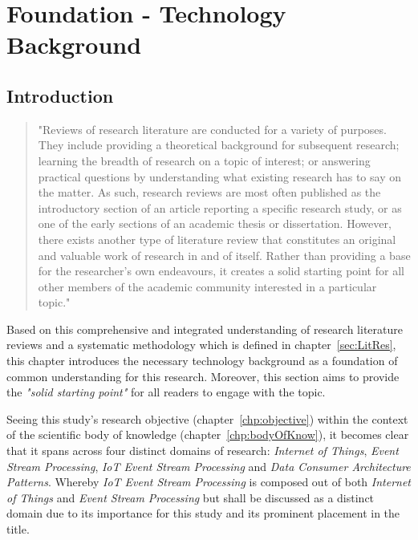 \chapter{Foundation - Technology Background}\label{chp:background}


\section{Introduction}

\blockquote{
    "Reviews of research literature are conducted for a variety of purposes. They include
    providing a theoretical background for subsequent research; learning the breadth of research on a
    topic of interest; or answering practical questions by understanding what existing research has to
    say on the matter. As such, research reviews are most often published as the introductory section
    of an article reporting a specific research study, or as one of the early sections of an academic
    thesis or dissertation. However, there exists another type of literature review that constitutes an
    original and valuable work of research in and of itself. Rather than providing a base for the
    researcher’s own endeavours, it creates a solid starting point for all other members of the
    academic community interested in a particular topic."\autocite{Okoli2010AResearch}
}

Based on this comprehensive and integrated understanding of research literature reviews and a systematic methodology which is defined in chapter~\vref{sec:LitRes}, this chapter introduces the necessary technology background as a foundation of common understanding for this research. Moreover, this section aims to provide the \textit{"solid starting point"} for all readers to engage with the topic. 

Seeing this study's research objective (chapter~\vref{chp:objective}) within the context of the scientific body of knowledge (chapter~\vref{chp:bodyOfKnow}), it becomes clear that it spans across four distinct domains of research: \textit{Internet of Things}, \textit{Event Stream Processing}, \textit{IoT Event Stream Processing} and \textit{Data Consumer Architecture Patterns}. Whereby \textit{IoT Event Stream Processing} is composed out of both \textit{Internet of Things} and \textit{Event Stream Processing} but shall be discussed as a distinct domain due to its importance for this study and its prominent placement in the title. 

